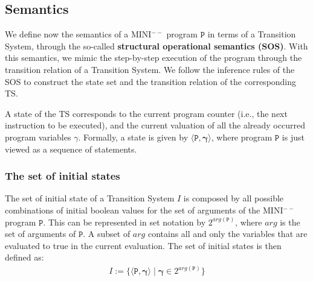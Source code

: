 \documentclass{article}
\begin{document}
\subsection{Semantics}
We define now the semantics of a MINI$^{--}$ program $\texttt{P}$ in terms of a Transition System, 
through the so-called \textbf{structural operational semantics (SOS)}. 
With this semantics, we mimic the step-by-step execution of the program 
through the transition relation of a Transition System. 
We follow the inference rules of the SOS to construct 
the state set and the transition relation of the corresponding TS.

A state of the TS corresponds to the current program counter (i.e., the next instruction to be executed), 
and the current valuation of all the already occurred program variables $\gamma$.
Formally, a state is given by $\langle \texttt{P}, \mathbf{\gamma} \rangle$, where program $\texttt{P}$ is just 
viewed as a sequence of statements.

\subsubsection{The set of initial states}
The set of initial state of a Transition System $I$ is composed by all possible combinations 
of initial boolean values for the set of arguments of the MINI$^{--}$ program $\texttt{P}$. 
This can be represented in set notation by $2^{arg(\texttt{P})}$, where $arg$ is the set of arguments of $\texttt{P}$. 
A subset of $arg$ contains all and only the variables that are evaluated to true in the current evaluation. 
The set of initial states is then defined as:
\begin{align*}
    I := \{ \langle \texttt{P}, \mathbf{\gamma} \rangle \mid \mathbf{\gamma} \in 2^{arg(\texttt{P})} \}
\end{align*}
\end{document}
